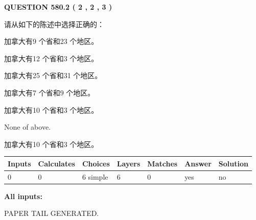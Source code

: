 \documentclass{ctexart}
\begin{document}
   
  
\vspace{0.2in}
  
{\textbf{\Large{QUESTION
580.2 
 ( 2 , 2 , 3 )
}}}
  
  
请从如下的陈述中选择正确的：
 
 
加拿大有9 个省和23 个地区。
 
 
加拿大有12 个省和3 个地区。
 
 
加拿大有25 个省和31 个地区。
 
 
加拿大有7 个省和9 个地区。
 
 
加拿大有10 个省和3 个地区。
 
 
 None of above.
 
 
\noindent{}
 
 
加拿大有10 个省和3 个地区。
 
 
\noindent{}
 
 
   
   
   
   
\noindent\begin{tabular}{|l|l|l|l|l|l|l|}
 \hline
Inputs & Calculates & Choices & Layers & Matches & Answer & Solution \\ \hline
 0  & 
 0  & 
 6
  simple  
  & 
 6  & 
 0  & 
  yes & 
  no 
  \\ \hline
 \end{tabular}
   
   
   
   
\noindent{}
   
   
   
   
\noindent\vspace{0.1in}\hspace{-0.08in} {\textbf{\Large{All inputs: }}}
   
   
   
   
   
   
 \vspace{0.2in}
 
   
   
\vspace{2.0in} PAPER TAIL GENERATED.
   
\end{document}
